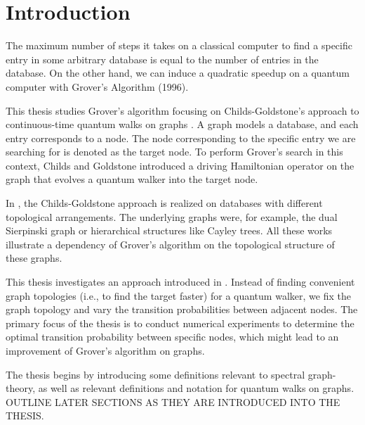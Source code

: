 \section{Introduction}
The maximum number of steps it takes on a classical computer to find a specific entry in some arbitrary database is equal to the number of entries in the database.
On the other hand, we can induce a quadratic speedup on a quantum computer with Grover's Algorithm (1996).

This thesis studies Grover's algorithm focusing on Childs-Goldstone's approach to continuous-time quantum walks on graphs \cite{ChildsGoldstone}.
A graph models a database, and each entry corresponds to a node.
The node corresponding to the specific entry we are searching for is denoted as the target node.
To perform Grover's search in this context, Childs and Goldstone introduced a driving Hamiltonian operator on the graph that evolves a quantum walker into the target node.

In \cite{extendChildsGoldstone}, the Childs-Goldstone approach is realized on databases with different topological arrangements.
The underlying graphs were, for example, the dual Sierpinski graph or hierarchical structures like Cayley trees.
All these works illustrate a dependency of Grover's algorithm on the topological structure of these graphs.

This thesis investigates an approach introduced in \cite{MograbyEtAl}.
Instead of finding convenient graph topologies (i.e., to find the target faster) for a quantum walker, we fix the graph topology and vary the transition probabilities between adjacent nodes.
The primary focus of the thesis is to conduct numerical experiments to determine the optimal transition probability between specific nodes, which might lead to an improvement of Grover's algorithm on graphs. 

The thesis begins by introducing some definitions relevant to spectral graph-theory, as well as relevant definitions and notation for quantum walks on graphs.
OUTLINE LATER SECTIONS AS THEY ARE INTRODUCED INTO THE THESIS.
